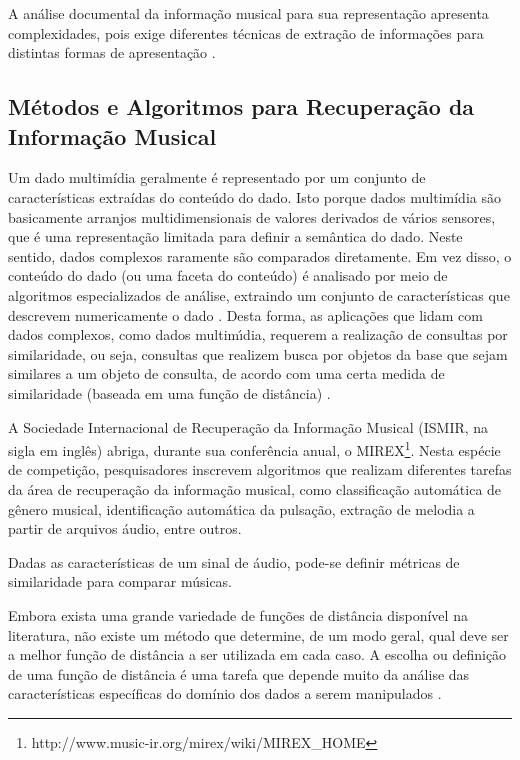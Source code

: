 A análise documental da informação musical para sua representação apresenta complexidades, pois exige diferentes técnicas de extração de informações para distintas formas de apresentação \cite{downie2003}.

\subsection{Métodos e Algoritmos para Recuperação da Informação Musical}

Um dado multimídia geralmente é representado por um conjunto de características extraídas do conteúdo do dado. Isto porque dados multimídia são basicamente arranjos multidimensionais de valores derivados de vários sensores, que é uma representação limitada para definir a semântica do dado. Neste sentido, dados complexos raramente são comparados diretamente. Em vez disso, o conteúdo do dado (ou uma faceta do conteúdo) é analisado por meio de algoritmos especializados de análise, extraindo um conjunto de características que descrevem numericamente o dado \cite{kaster2012}. Desta forma, as aplicações que lidam com dados complexos, como dados multimı́dia, requerem a realização de consultas por similaridade, ou seja, consultas que realizem busca por objetos da base que sejam similares a um objeto de consulta, de acordo com uma certa medida de similaridade (baseada em uma função de distância) \cite{barioni2006}.

A Sociedade Internacional de Recuperação da Informação Musical (ISMIR, na sigla em inglês) abriga, durante sua conferência anual, o MIREX\footnote{http://www.music-ir.org/mirex/wiki/MIREX_HOME}. Nesta espécie de competição, pesquisadores inscrevem algoritmos que realizam diferentes tarefas da área de recuperação da informação musical, como classificação automática de gênero musical, identificação automática da pulsação, extração de melodia a partir de arquivos áudio, entre outros.

Dadas as características de um sinal de áudio, pode-se definir métricas de similaridade para comparar músicas.

Embora exista uma grande variedade de funções de distância disponível na literatura, não existe um método que determine, de um modo geral, qual deve ser a melhor função de distância a ser utilizada em cada caso. A escolha ou definição de uma função de distância é uma tarefa que depende muito da análise das características específicas do domínio dos dados a serem manipulados \cite{barioni2006}.

